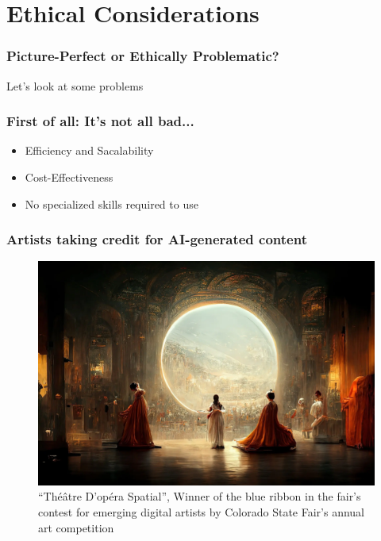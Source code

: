 \documentclass[
	11pt, compress%
]{beamer}
\begin{document}
\section{Ethical Considerations}
\begin{frame}
\begin{center}
	\frametitle{Picture-Perfect or Ethically Problematic?}
	\huge Let's look at some problems
\end{center}
\end{frame}

\begin{frame}
	\frametitle{First of all: It's not all bad...}
	\begin{itemize}
		\setlength\itemsep{2em}
		\item Efficiency and Sacalability
		\item Cost-Effectiveness
		\item No specialized skills required to use
	\end{itemize}
\end{frame}

\begin{frame}
		\frametitle{Artists taking credit for AI-generated content}
		\begin{figure}
			\includegraphics[width=0.78\linewidth]{Images/ColoradoStateFairWinner.png}
			\caption{\tiny “Théâtre D’opéra Spatial”, Winner of the blue ribbon in the fair’s contest for emerging digital artists by Colorado State Fair’s annual art competition}
		\end{figure}
	\end{frame}
\end{document}
